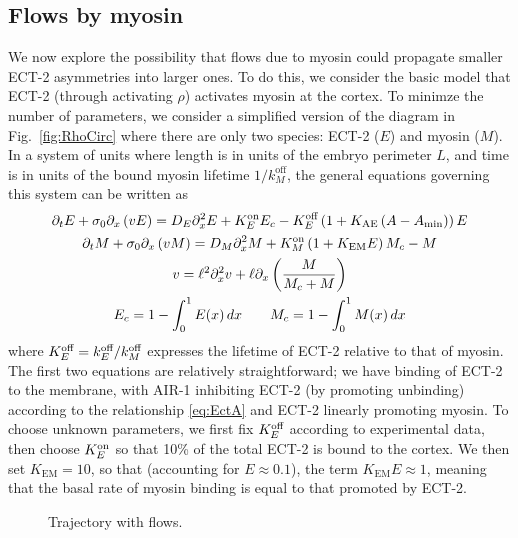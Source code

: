 \documentclass[11pt]{article}
\begin{document}
\subsection{Flows by myosin}
We now explore the possibility that flows due to myosin could propagate smaller ECT-2 asymmetries into larger ones. To do this, we consider the basic model that ECT-2 (through activating $\rho$) activates myosin at the cortex. To minimze the number of parameters, we consider a simplified version of the diagram in Fig.\ \ref{fig:RhoCirc} where there are only two species: ECT-2 ($E$) and myosin ($M$). 
In a system of units where length is in units of the embryo perimeter $L$, and time is in units of the bound myosin lifetime $1/k^\text{off}_M$, the general equations governing this system can be written as
\begin{subequations}
\label{eq:MySimple}
\begin{gather}
\partial_t E + \sigma_0 \partial_x \left( v E\right) = D_E \partial_x^2 E +K^\text{on}_E E_c - K^\text{off}_E  \left(1+K_\text{AE} \left(A-A_\text{min}\right)\right)E \\
\partial_t M + \sigma_0 \partial_x \left( v M \right) = D_M \partial_x^2 M + K^\text{on}_M \left(1+K_\text{EM} E \right) M_c - M \\
\label{eq:veleqn}
v = \ell^2 \partial_x^2 v +\ell \partial_x \left(\frac{M}{M_c+M}\right) \\
E_c = 1-\int_0^1 E(x) \, dx \qquad M_c = 1-\int_0^1 M(x) \, dx
\end{gather} 
\end{subequations}
where $K^\text{off}_E=k^\text{off}_E/k^\text{off}_M$ expresses the lifetime of ECT-2 relative to that of myosin. The first two equations are relatively straightforward; we have binding of ECT-2 to the membrane, with AIR-1 inhibiting ECT-2 (by promoting unbinding) according to the relationship \eqref{eq:EctA} and ECT-2 linearly promoting myosin. To choose unknown parameters, we first fix $K^\text{off}_E$ according to experimental data, then choose $K^\text{on}_E$ so that 10\% of the total ECT-2 is bound to the cortex. We then set $K_\text{EM}=10$, so that (accounting for $E \approx 0.1$), the term $K_\text{EM}E \approx 1$, meaning that the basal rate of myosin binding is equal to that promoted by ECT-2. 

\begin{figure}
\centering
{}
\caption{\label{fig:TryFlows} Trajectory with flows.}
\end{figure}
\end{document}
